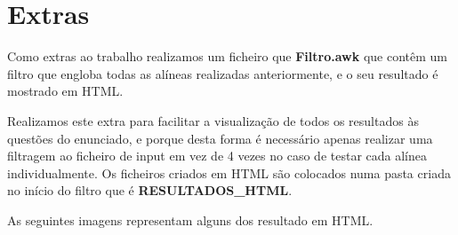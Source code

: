 \documentclass[11pt,a4paper]{report}
\begin{document}
\chapter{Extras}
\label{chap:extras}

Como extras ao trabalho realizamos um ficheiro que \textbf{Filtro.awk} que contêm um filtro que engloba todas as alíneas realizadas anteriormente, e o seu resultado é mostrado em HTML.

Realizamos este extra para facilitar a visualização de todos os resultados às questões do enunciado, e porque desta forma é necessário apenas realizar uma filtragem ao ficheiro de input em vez de 4 vezes no caso de testar cada alínea individualmente. Os ficheiros criados em HTML são colocados numa pasta criada no início do filtro que é \textbf{RESULTADOS\_HTML}.

As seguintes imagens representam alguns dos resultado em HTML.
\end{document}
